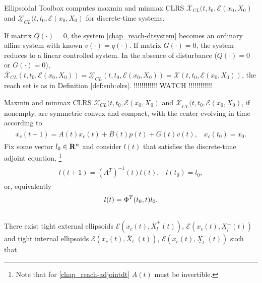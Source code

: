 \documentclass[letterpaper,10pt,english]{sphinxmanual}
\begin{document}
Ellipsoidal Toolbox computes maxmin and minmax CLRS
$\overline{{\mathcal X}}_{CL}(t, t_0, {\mathcal E}(x_0, X_0)$ and
$\underline{{\mathcal X}}_{CL}(t, t_0, {\mathcal E}(x_0, X_0)$ for
discrete-time systems.

If matrix $Q(\cdot)=0$, the system \eqref{chap_reach-dtsystem} becomes an
ordinary affine system with known $v(\cdot)=q(\cdot)$. If matrix
$G(\cdot)=0$, the system reduces to a linear controlled system. In
the absence of disturbance ($Q(\cdot)=0$ or $G(\cdot)=0$),
$\overline{{\mathcal X}}_{CL}(t,t_0,{\mathcal E}(x_0,X_0))=\underline{{\mathcal X}}_{CL}(t,t_0,{\mathcal E}(x_0,X_0))={\mathcal X}(t,t_0,{\mathcal E}(x_0,X_0))$,
the reach set is as in Definition {[}def:sub:\emph{o}lrs{]}. !!!!!!!!!!!! WATCH !!!!!!!!!!!!

Maxmin and minmax CLRS
$\overline{{\mathcal X}}_{CL}(t, t_0, {\mathcal E}(x_0, X_0)$ and
$\underline{{\mathcal X}}_{CL}(t, t_0, {\mathcal E}(x_0, X_0)$, if
nonempty, are symmetric convex and compact, with the center evolving in
time according to
\label{chap_reach:equation-fwdcenterd}\begin{gather}
\begin{split}x_c(t+1) = A(t)x_c(t) + B(t)p(t) + G(t)v(t), \;\;\; x_c(t_0)=x_0.\end{split}\label{chap_reach-fwdcenterd}
\end{gather}
Fix some vector $l_0\in{\bf R}^n$ and consider $l(t)$ that
satisfies the discrete-time adjoint equation, \footnote{
Note that for \eqref{chap_reach-adjointdt} $A(t)$ must be invertible.
}
\label{chap_reach:equation-adjointdt}\begin{gather}
\begin{split}l(t+1) = \left(A^T\right)^{-1}(t)l(t), \;\;\; l(t_0) = l_0,\end{split}\label{chap_reach-adjointdt}
\end{gather}
or, equivalently
\begin{gather}
\begin{split}l(t) = \Phi^T(t_0, t)l_0 .\end{split}\notag\\\begin{split}\end{split}\notag
\end{gather}
There exist tight external ellipsoids
${\mathcal E}(x_c(t), \overline{X}^+_l(t))$,
${\mathcal E}(x_c(t), \underline{X}^+_l(t))$ and tight internal
ellipsoids ${\mathcal E}(x_c(t), \overline{X}^-_l(t))$,
${\mathcal E}(x_c(t), \underline{X}^-_l(t))$ such that
\end{document}
